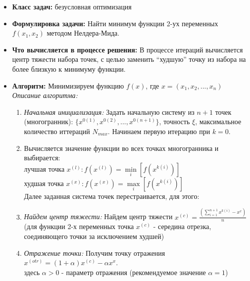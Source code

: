 \begin{itemize}
    \item {\bfseries Класс задач:} безусловная оптимизация
    
    
    \item {\bfseries Формулировка задачи:} Найти минимум функции 2-ух переменных $f(x_1, x_2)$ методом Нелдера-Мида.
    
    
    \item {\bfseries Что вычисляется в процессе решения:}
    В процессе итераций вычисляется центр тяжести набора точек, с целью заменить \enquote{худшую} точку из набора на более близкую к минимуму функции.
    
    \item {\bfseries Алгоритм:}
    Минимизируем функцию $f(x)$, где $x = (x_1, x_2, ..., x_n)$ \\
    {\it Описание алгоритма:}
    \begin{enumerate}
        \item {\it Начальная инициализация:} Задать начальную систему из $n+1$ точек (многогранник): $\{x^{0(1)}, x^{0(2)}, ..., x^{0(n+1)}\}$, точность $\xi$, максимальное количество иттераций $N_{max}$. Начинаем первую итерацию при $k = 0$.
        
        \item Вычисляется значение функции во всех точках многогранника и выбирается:\\
        	лучшая точка $x^{(l)}: f(x^{(l)}) = \underset{i}{\operatorname{min}}[f(x^{k(i)})]$\\
        	худшая точка $x^{(x)}: f(x^{(x)}) = \underset{i}{\operatorname{max}}[f(x^{k(i)})]$\\
        Далее заданная система точек перестраивается, для этого:
         
        \item {\it Найдем центр тяжести:} Найдем центр тяжести $x^{(c)} = \displaystyle\frac{(\sum\limits^{n+1}_{i=1} x^{k(i)} - x^{x})}{n}$\\
        (для функции 2-х переменных точка $x^{(c)}$ - середина отрезка, соединяющего точки за исключением худшей) 
        
        \item {\it Отражение точки:} Получим точку отражения $x^{(otr)} = (1 + \alpha)x^{(c)} - \alpha x^{x}$.\\

        здесь $ \alpha > 0$ - параметр отражения (рекомендуемое значение $\alpha = 1$)


\end{enumerate}
\end{itemize}
